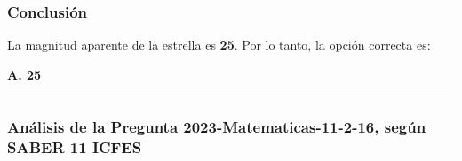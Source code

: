 \documentclass[
]{article}
\begin{document}
\subsubsection{Conclusión}\label{conclusiuxf3n-12}

La magnitud aparente de la estrella es \textbf{25}. Por lo tanto, la
opción correcta es:

\textbf{A. 25}

\begin{center}\rule{0.5\linewidth}{0.5pt}\end{center}

\subsubsection{Análisis de la Pregunta 2023-Matematicas-11-2-16, según
SABER 11
ICFES}\label{anuxe1lisis-de-la-pregunta-2023-matematicas-11-2-16-seguxfan-saber-11-icfes}
\end{document}

